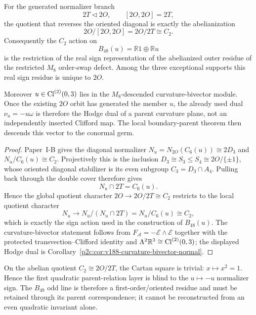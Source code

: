 \documentclass[12pt,a4paper]{article}
\begin{document}
\begin{corollary}
\label{p3c:cor:v188-b48-abelianized-normalizer}
For the generated normalizer branch
\[
 2T\triangleleft2O,
 \qquad [2O,2O]=2T,
\]
the quotient that reverses the oriented diagonal is exactly the abelianization
\[
 \boxed{2O/[2O,2O]=2O/2T\cong C_2.}
\]
Consequently the $C_2$ action on
\[
 B_{48}(u)=\mathbb R1\oplus\mathbb Ru
\]
is the restriction of the real sign representation of the abelianized outer
residue of the restricted $M_8$ order-swap defect.  Among the three exceptional
supports this real sign residue is unique to $2O$.

Moreover $u\in\operatorname{Cl}^{(2)}(0,3)$ lies in the $M_8$-descended curvature-bivector
module.  Once the existing $2O$ orbit has generated the member $u$, the
already used dual $\nu_u=-u\omega$ is therefore the Hodge dual of a parent
curvature plane, not an independently inserted Clifford map.  The local
boundary-parent theorem then descends this vector to the conormal germ.
\end{corollary}

\begin{proof}
Paper~I-B gives the diagonal normalizer
$N_u=N_{2O}(C_6(u))\cong2D_3$ and
$N_u/C_6(u)\cong C_2$.  Projectively this is the inclusion
$D_3\cong S_3\le S_4\cong2O/\{\pm1\}$, whose oriented diagonal stabilizer is
its even subgroup $C_3=D_3\cap A_4$.  Pulling back through the double cover
therefore gives
\[
 N_u\cap2T=C_6(u).
\]
Hence the global quotient character $2O\to2O/2T\cong C_2$ restricts to the
local quotient character
\[
 N_u\longrightarrow N_u/(N_u\cap2T)
 =N_u/C_6(u)\cong C_2,
\]
which is exactly the sign action used in the construction of $B_{48}(u)$.
The curvature-bivector statement follows from
$F_{\mathcal A}=-\mathcal E\wedge\mathcal E$ together with the protected
transvection--Clifford identity and
$\Lambda^2\mathbb R^3\cong\operatorname{Cl}^{(2)}(0,3)$; the displayed Hodge dual is
Corollary~\ref{p2c:cor:v188-curvature-bivector-normal}.
\end{proof}

\begin{remark}
\label{p3c:rem:v188-b48-square-even}
On the abelian quotient $C_2\cong2O/2T$, the Cartan square is trivial:
$x\mapsto x^2=1$.  Hence the first quadratic parent-relation layer is blind to
the $u\mapsto-u$ normalizer sign.  The $B_{48}$ odd line is therefore a
first-order/oriented residue and must be retained through its parent
correspondence; it cannot be reconstructed from an even quadratic invariant
alone.
\end{remark}
\end{document}

